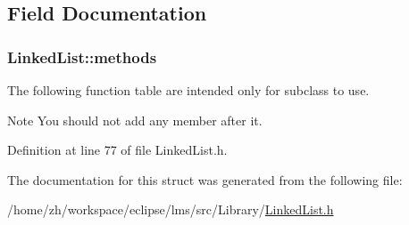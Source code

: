 \subsection{Field Documentation}
\hypertarget{structLinkedList_ab6cc1736f85c5b6241908fd411d11c4b}{
\subsubsection[{methods}]{ Linked\-List\-::methods\hspace{0.3cm}{\ttfamily [protected]}}}\label{structLinkedList_ab6cc1736f85c5b6241908fd411d11c4b}


The following function table are intended only for subclass to use. 

\begin{DoxyNote}{Note}
You should not add any member after it. 
\end{DoxyNote}


Definition at line 77 of file Linked\-List.\-h.



The documentation for this struct was generated from the following file\-:\begin{DoxyCompactItemize}
\item 
/home/zh/workspace/eclipse/lms/src/\-Library/\hyperlink{LinkedList_8h}{Linked\-List.\-h}\end{DoxyCompactItemize}
